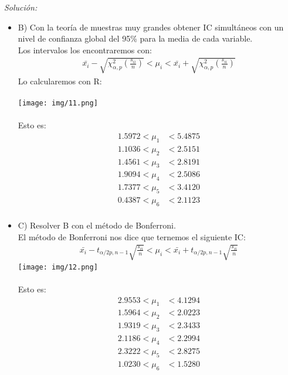 \documentclass[12pt]{article}
\newenvironment{sol}
    {\emph{Solución:}
    }
    {
    }
\begin{document}
\begin{sol}
\begin{itemize}
\item B) Con la teoría de muestras muy grandes obtener IC simultáneos con un nivel de confianza global del 95\% para la media de cada variable.\\
Los intervalos los encontraremos con:
\begin{align*}
\bar{x_i}-\sqrt{\chi_{\alpha,p}^2(\frac{s_{ii}}{n})} < \mu_i < \bar{x_i}+\sqrt{\chi_{\alpha,p}^2(\frac{s_{ii}}{n})}
\end{align*}
Lo calcularemos con R:\\\\
\texttt{[image: img/11.png]}\\\\
Esto es: 
\begin{align*}
 1.5972 < \mu_1 &< 5.4875 \\
 1.1036 < \mu_2 &< 2.5151 \\
 1.4561 < \mu_3 &< 2.8191 \\
 1.9094 < \mu_4 &< 2.5086 \\
 1.7377 < \mu_5 &< 3.4120 \\
 0.4387 < \mu_6 &< 2.1123 \\
\end{align*} \pagebreak
\item C) Resolver B con el método de Bonferroni. \\
El método de Bonferroni nos dice que ternemos el siguiente IC:
\begin{align*}
\bar{x_i}-t_{\alpha / 2p,n-1}\sqrt{\frac{s_{ii}}{n}}<\mu_i<\bar{x_i}+t_{\alpha / 2p,n-1}\sqrt{\frac{s_{ii}}{n}}
\end{align*}
\texttt{[image: img/12.png]}\\\\
Esto es:
\begin{align*}
2.9553 < \mu_1 &< 4.1294 \\
1.5964 < \mu_2 &< 2.0223 \\
1.9319 < \mu_3 &< 2.3433 \\
2.1186 < \mu_4 &< 2.2994 \\
2.3222 < \mu_5 &< 2.8275 \\
1.0230 < \mu_6 &< 1.5280 \\
\end{align*}

\end{itemize}
\end{sol}

\end{document}
